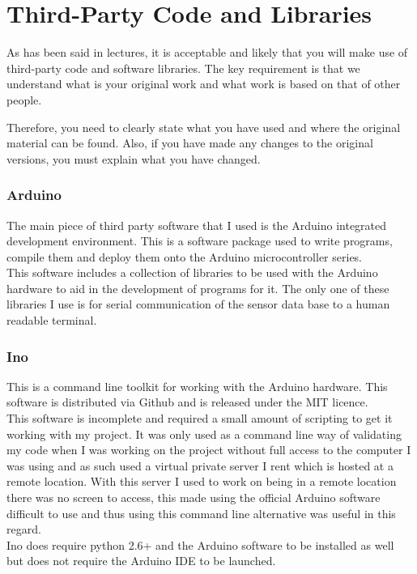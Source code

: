 \chapter{Third-Party Code and Libraries}


As has been said in lectures, it is acceptable and likely that you will make use of third-party code and software libraries. The key requirement is that we understand what is your original work and what work is based on that of other people. 

Therefore, you need to clearly state what you have used and where the original material can be found. Also, if you have made any changes to the original versions, you must explain what you have changed.
\subsection{Arduino}
The main piece of third party software that I used is the Arduino integrated development environment.  This is a software package used to write programs, compile them and deploy them onto the Arduino microcontroller series.
\\This software includes a collection of libraries to be used with the Arduino hardware to aid in the development of programs for it.  The only one of these libraries I use is for serial communication of the sensor data base to a human readable terminal.

\subsection{Ino}
This is a command line toolkit for working with the Arduino hardware.  This software is distributed via Github and is released under the MIT licence.
\\This software is incomplete and required a small amount of scripting to get it working with my project.  It was only used as a command line way of validating my code when I was working on the project without full access to the computer I was using and as such used a virtual private server I rent which is hosted at a remote location.  With this server I used to work on being in a remote location there was no screen to access, this made using the official Arduino software difficult to use and thus using this command line alternative was useful in this regard.
\\Ino does require python 2.6+ and the Arduino software to be installed as well but does not require the Arduino IDE to be launched.
